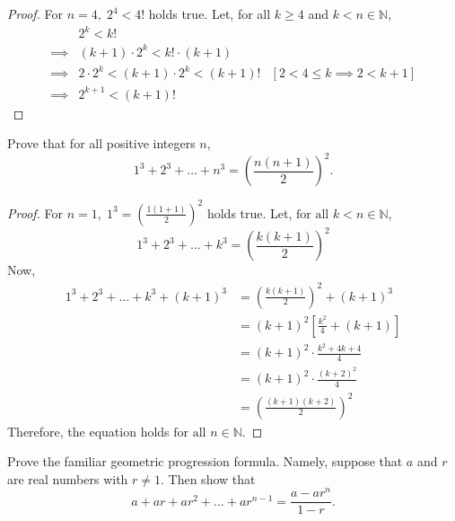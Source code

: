 \documentclass[12pt]{article}
\newenvironment{problem}[2][Problem]{\begin{trivlist}
\item[\hskip \labelsep {\bfseries #1}\hskip \labelsep {\bfseries #2.}]}{\end{trivlist}}
\begin{document}
\begin{proof}
	For $n = 4, \; 2^4 < 4!$ holds true.
	Let, for all $k \geq 4$ and $k < n \in \mathbb{N}$,
	\begin{align*}
		         & 2^k < k!                                                                 \\
		\implies & (k+1) \cdot 2^k < k!\cdot (k+1)                                          \\
		\implies & 2\cdot 2^k < (k+1)\cdot 2^k < (k+1)! & [2 < 4 \leq k \implies 2 < k + 1] \\
		\implies & 2^{k+1} < (k+1)!
	\end{align*}

\end{proof}

\begin{problem}{6}
Prove that for all positive integers \( n \),
\[
	1^3 + 2^3 + \dots + n^3 = \left( \frac{n(n + 1)}{2} \right)^2.
\]

\end{problem}

\begin{proof}
	For $n = 1, \; 1^3 = (\frac{1(1+1)}{2})^2$ holds true.
	Let, $\text{for all } k < n \in \mathbb{N}$,
	\[
		1^3 + 2^3 + \dots + k^3 = \left( \frac{k(k + 1)}{2} \right)^2
	\]
	Now, \\
	\begin{align*}
		1^3 + 2^3 + \dots + k^3 + (k+1)^3 & = \left( \frac{k(k + 1)}{2} \right)^2 + (k+1)^3 \\
		                                  & = (k+1)^2[\frac{k^2}{4} + (k+1)]                \\
		                                  & = (k+1)^2 \cdot \frac{k^2 + 4k +4}{4}           \\
		                                  & = (k+1)^2 \cdot \frac{(k+2)^2}{4}               \\
		                                  & = \left( \frac{(k+1)(k+2)}{2} \right)^2
	\end{align*}
	Therefore, the equation holds $\text{for all } n \in \mathbb{N}$.

\end{proof}

\begin{problem}{7}
Prove the familiar geometric progression formula. Namely, suppose that \( a \) and \( r \)
are real numbers with \( r \neq 1 \). Then show that
\[
	a + ar + ar^2 + \dots + ar^{n-1} = \frac{a - a r^n}{1 - r}.
\]

\end{problem}
\end{document}
